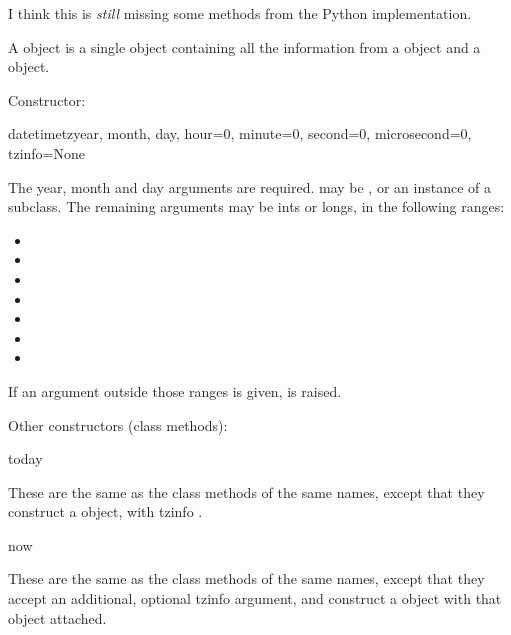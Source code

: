 \begin{notice}[warning]
  I think this is \emph{still} missing some methods from the
  Python implementation.
\end{notice}

A  object is a single object containing all the information
from a  object and a  object.

Constructor:

\begin{funcdesc}{datetimetz}{year, month, day,
               hour=0, minute=0, second=0, microsecond=0, tzinfo=None}

    The year, month and day arguments are required.   may
    be , or an instance of a  subclass.  The
    remaining arguments may be ints or longs, in the following ranges:

\begin{itemize}
  \item {}
  \item {}
  \item {}
  \item {}
  \item {}
  \item {}
  \item {}
\end{itemize}

    If an argument outside those ranges is given,
     is raised.
\end{funcdesc}

Other constructors (class methods):

\begin{funcdesc}{today}{}

    These are the same as the  class methods of the
    same names, except that they construct a 
    object, with tzinfo .
\end{funcdesc}

\begin{funcdesc}{now}{}

    These are the same as the  class methods of the same names,
    except that they accept an additional, optional tzinfo argument, and
    construct a  object with that  object attached.
\end{funcdesc}

